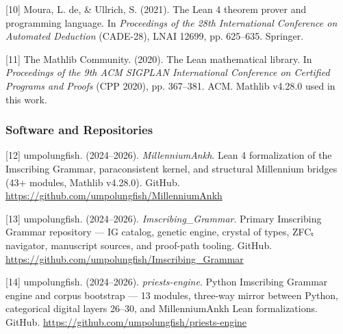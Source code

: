 \documentclass[10pt,a4paper]{article}
\begin{document}
{[}10{]} Moura, L. de, \& Ullrich, S. (2021). The Lean 4 theorem prover and programming language. In \emph{Proceedings of the 28th International Conference on Automated Deduction} (CADE-28), LNAI 12699, pp. 625--635. Springer.

{[}11{]} The Mathlib Community. (2020). The Lean mathematical library. In \emph{Proceedings of the 9th ACM SIGPLAN International Conference on Certified Programs and Proofs} (CPP 2020), pp. 367--381. ACM. Mathlib v4.28.0 used in this work.

\subsubsection{Software and Repositories}

{[}12{]} umpolungfish. (2024--2026). \emph{MillenniumAnkh}. Lean 4 formalization of the Imscribing Grammar, paraconsistent kernel, and structural Millennium bridges (43+ modules, Mathlib v4.28.0). GitHub. \href{}{https://github.com/umpolungfish/MillenniumAnkh}

{[}13{]} umpolungfish. (2024--2026). \emph{Imscribing\_Grammar}. Primary Imscribing Grammar repository --- IG catalog, genetic engine, crystal of types, ZFCₜ navigator, manuscript sources, and proof-path tooling. GitHub. \href{}{https://github.com/umpolungfish/Imscribing\_Grammar}

{[}14{]} umpolungfish. (2024--2026). \emph{priests-engine}. Python Imscribing Grammar engine and corpus bootstrap --- 13 modules, three-way mirror between Python, categorical digital layers 26--30, and MillenniumAnkh Lean formalizations. GitHub. \href{}{https://github.com/umpolungfish/priests-engine}
\end{document}

